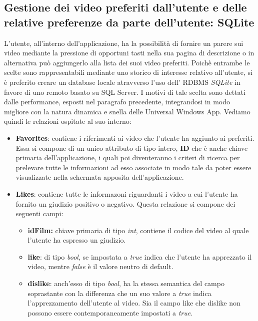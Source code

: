 \documentclass[a4]{book}
\begin{document}
\subsection{Gestione dei video preferiti dall'utente e delle relative preferenze da parte dell'utente: SQLite}
L'utente, all'interno dell'applicazione, ha la possibilità di fornire un parere sui video mediante la pressione di opportuni tasti nella sua pagina di descrizione o in alternativa può aggiungerlo alla lista dei suoi video preferiti. Poichè entrambe le scelte sono rappresentabili mediante uno storico di interesse relativo all'utente, si è preferito creare un database locale atravverso l'uso dell' RDBMS \textit{SQLite} in favore di uno remoto basato su SQL Server. I motivi di tale scelta sono dettati dalle performance, esposti nel paragrafo precedente, integrandosi in modo migliore con la natura dinamica e snella delle Universal Windows App. Vediamo quindi le relazioni ospitate al suo interno:

\begin{itemize}
	\item \textbf{Favorites}: contiene i riferimenti ai video che l'utente ha aggiunto ai preferiti. Essa si compone di un unico attributo di tipo intero, \textbf{ID} che è anche chiave primaria dell'applicazione, i quali poi diventeranno i criteri di ricerca per prelevare tutte le informazioni ad esso associate in modo tale da poter essere visualizzate nella schermata apposita dell'applicazione.
	\item \textbf{Likes}: contiene tutte le informazoni riguardanti i video a cui l'utente ha fornito un giudizio positivo o negativo. Questa relazione si compone dei seguenti campi:
	\begin{itemize}
		\item \textbf{idFilm:} chiave primaria di tipo \textit{int}, contiene il codice del video al quale l'utente ha espresso un giudizio.
		\item \textbf{like}: di tipo \textit{bool}, se impostata a \textit{true} indica che l'utente ha apprezzato il video, mentre \textit{false} è il valore neutro di default.
		\item \textbf{dislike}: anch'esso di tipo \textit{bool}, ha la stessa semantica del campo soprastante con la differenza che un suo valore a \textit{true} indica l'apprezzamento dell'utente al video. Sia il campo like che dislike non possono essere contemporaneamente impostati a \textit{true}.
	\end{itemize}
\end{itemize}
\end{document}
